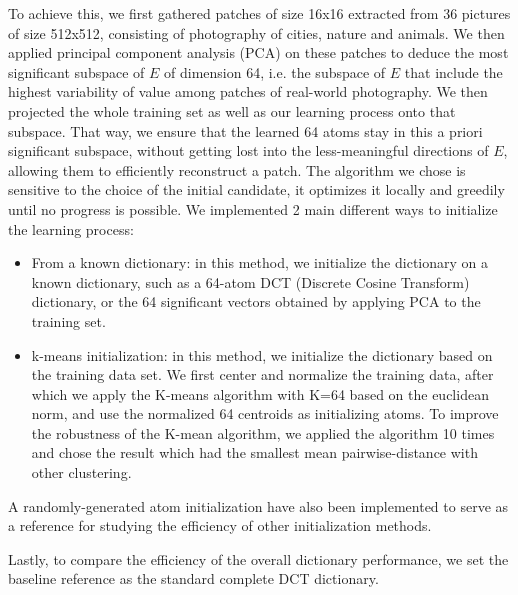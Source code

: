To achieve this, we first gathered patches of size 16x16 extracted from 36 pictures of size 512x512, consisting of photography of cities, nature and animals. We then applied principal component analysis (PCA) on these patches to deduce the most significant subspace of $E$ of dimension 64, i.e. the subspace of $E$ that include the highest variability of value among patches of real-world photography. We then projected the whole training set as well as our learning process onto that subspace. That way, we ensure that the learned 64 atoms stay in this a priori significant subspace, without getting lost into the less-meaningful directions of $E$, allowing them to efficiently reconstruct a patch.
The algorithm we chose is sensitive to the choice of the initial candidate, it optimizes it locally and greedily until no progress is possible. We implemented 2 main different ways to initialize the learning process:
\begin{itemize}
   \item From a known dictionary: in this method, we initialize the dictionary on a known dictionary, such as a 64-atom DCT (Discrete Cosine Transform) dictionary, or the 64 significant vectors obtained by applying PCA to the training set.  
   \item k-means initialization: in this method, we initialize the dictionary based on the training data set. We first center and normalize the training data, after which we apply the K-means algorithm with K=64 based on the euclidean norm, and use the normalized 64 centroids as initializing atoms. To improve the robustness of the K-mean algorithm, we applied the algorithm 10 times and chose the result which had the smallest mean pairwise-distance with other clustering. 
\end{itemize}
A randomly-generated atom initialization have also been implemented to serve as a reference for studying the efficiency of other initialization methods. 

Lastly, to compare the efficiency of the overall dictionary performance, we set the baseline reference as the standard complete DCT dictionary.

































